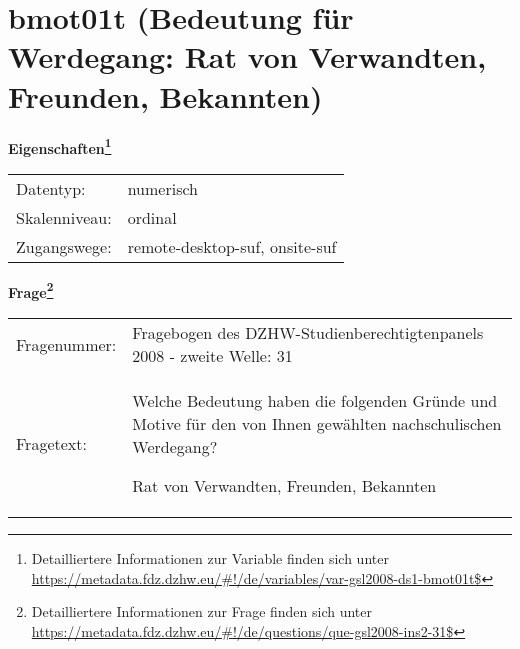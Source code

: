 
    \setcounter{footnote}{0}

    \vspace*{-1.8cm}
	\section{bmot01t (Bedeutung für Werdegang: Rat von Verwandten, Freunden, Bekannten)}
	\label{section:bmot01t}



    \vspace*{0.5cm}
    \noindent\textbf{Eigenschaften\footnote{Detailliertere Informationen zur Variable finden sich unter
		\url{https://metadata.fdz.dzhw.eu/\#!/de/variables/var-gsl2008-ds1-bmot01t$}}}\\
	\begin{tabularx}{\hsize}{@{}lX}
	Datentyp: & numerisch \\
	Skalenniveau: & ordinal \\
	Zugangswege: &
	  remote-desktop-suf, 
	  onsite-suf
 \\
    \end{tabularx}



				\vspace*{0.5cm}
                \noindent\textbf{Frage\footnote{Detailliertere Informationen zur Frage finden sich unter
		              \url{https://metadata.fdz.dzhw.eu/\#!/de/questions/que-gsl2008-ins2-31$}}}\\
				\begin{tabularx}{\hsize}{@{}lX}
					Fragenummer: &
					  Fragebogen des DZHW-Studienberechtigtenpanels 2008 - zweite Welle:
					  31
 \\
					Fragetext: & Welche Bedeutung haben die folgenden Gründe und Motive für den von Ihnen gewählten nachschulischen Werdegang?\par  Rat von Verwandten, Freunden, Bekannten \\
				\end{tabularx}





